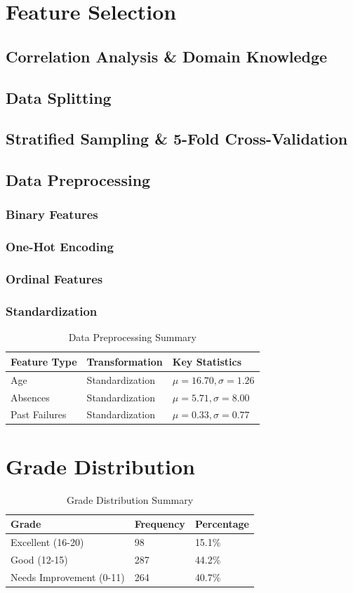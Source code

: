 \documentclass[twocolumn]{svjour3}
\begin{document}
\section{Feature Selection}
\subsection{Correlation Analysis \& Domain Knowledge}
\subsection{Data Splitting}
\subsection{Stratified Sampling \& 5-Fold Cross-Validation}
\subsection{Data Preprocessing}
\subsubsection{Binary Features}
\subsubsection{One-Hot Encoding}
\subsubsection{Ordinal Features}
\subsubsection{Standardization}
\begin{table}
\centering
\caption{Data Preprocessing Summary}
\begin{tabular}{lll}
\hline
Feature Type & Transformation & Key Statistics \\
\hline
Age & Standardization & $\mu=16.70, \sigma=1.26$ \\
Absences & Standardization & $\mu=5.71, \sigma=8.00$ \\
Past Failures & Standardization & $\mu=0.33, \sigma=0.77$ \\
\hline
\end{tabular}
\end{table}
\section{Grade Distribution}
\begin{table}
\centering
\caption{Grade Distribution Summary}
\begin{tabular}{lll}
\hline
Grade & Frequency & Percentage \\
\hline
Excellent (16-20) & 98 & 15.1\% \\
Good (12-15) & 287 & 44.2\% \\
Needs Improvement (0-11) & 264 & 40.7\% \\
\hline
\end{tabular}
\end{table}
\end{document}
